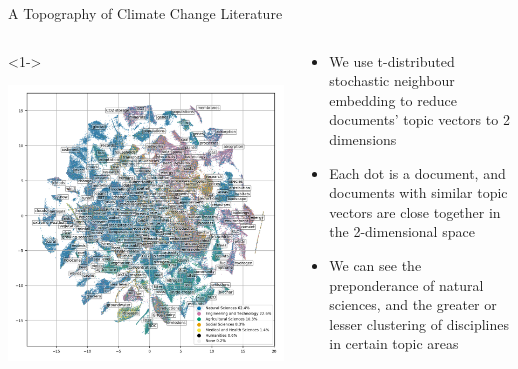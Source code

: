 \documentclass[9pt, aspectratio=169]{beamer}
\begin{document}
\begin{frame}[plain]{A Topography of Climate Change Literature}


\vspace{-0.5cm}

\begin{columns}
	\begin{column}{0.6\linewidth}<1->
		\begin{center}
			\includegraphics[width=0.9\linewidth]{../tsne_results/plots/run_1861_s_0_p100_all_topic_words_oecds_lp.png}
		\end{center}
		
	\end{column}
	
	
	\begin{column}{0.4\linewidth}
		\begin{itemize}
			\item<1-> We use t-distributed stochastic neighbour embedding \citep{vandermaaten2008}
			to reduce documents' topic vectors to 2 dimensions  
			\item<2-> Each dot is a document, and documents with similar topic vectors are close together in the 2-dimensional space
			\item<3-> We can see the preponderance of natural sciences, and the greater or lesser clustering of disciplines in certain topic areas
			
			
		\end{itemize}
	\end{column}
\end{columns}

\end{frame}
\end{document}

